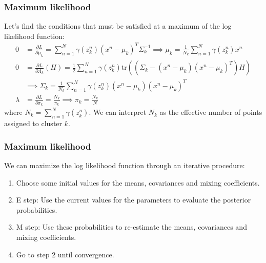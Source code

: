 \documentclass{beamer}
\begin{document}
\begin{frame}
    \frametitle{Maximum likelihood}
    Let's find the conditions that must be satisfied at a maximum of the log likelihood function:
    \begin{align*}
        0&=\frac{\partial{}L}{\partial\mu_{k}}=\sum_{n=1}^{N}\gamma(z^{n}_{k})(x^{n}-\mu_{k})^{T}\Sigma_{k}^{-1}\implies\mu_{k}=\frac{1}{N_{k}}\sum_{n=1}^{N}\gamma(z^{n}_{k})x^{n} \\
        0&=\frac{\partial{}L}{\partial\Lambda_{k}}(H)=\frac{1}{2}\sum_{n=1}^{N}\gamma(z^{n}_{k})\mathrm{tr}((\Sigma_{k}-(x^{n}-\mu_{k})(x^{n}-\mu_{k})^{T})H) \\
        &\implies\Sigma_{k}=\frac{1}{N_{k}}\sum_{n=1}^{N}\gamma(z^{n}_{k})(x^{n}-\mu_{k})(x^{n}-\mu_{k})^{T} \\
        \lambda&=\frac{\partial{}L}{\partial\pi_{k}}=\frac{N_{k}}{\pi_{k}}\implies\pi_{k}=\frac{N_{k}}{N}
    \end{align*}
    where $N_{k}=\sum_{n=1}^{N}\gamma(z^{n}_{k})$. We can interpret $N_{k}$ as the effective number of points assigned to cluster $k$.
\end{frame}

\begin{frame}
    \frametitle{Maximum likelihood}
    We can maximize the log likelihood function through an iterative procedure:
    \begin{enumerate}
        \item Choose some initial values for the means, covariances and mixing coefficients.
        \item E step: Use the current values for the parameters to evaluate the posterior probabilities.
        \item M step: Use these probabilities to re-estimate the means, covariances and mixing coefficients.
        \item Go to step 2 until convergence.
    \end{enumerate}
\end{frame}
\end{document}
